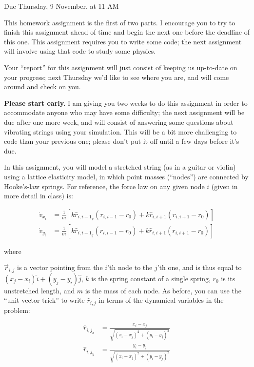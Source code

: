 \documentclass[12pt]{article}
\begin{document}
\Large
\centerline{}
\centerline{Due Thursday, 9 November, at 11 AM}
\normalsize

This homework assignment is the first of two parts. I encourage you to try to finish this assignment ahead of time
and begin the next one before the deadline of this one. This assignment requires you to write some code; the next assignment will involve using that code to study
some physics.

Your ``report'' for this assignment will just consist of keeping us up-to-date on your progress; next Thursday we'd like to see where you are, and will come around
and check on you.

{\bf Please start early.} 
I am giving you two weeks to do this assignment in order to accommodate anyone who may have some difficulty; the next assignment will be due after one more week, and will consist of answering some questions 
about vibrating strings using your simulation. This will be a bit more challenging to code than your previous one; please don't put it off until a few days before it's due.

In this assignment, you will model a stretched string (as in a guitar or violin) using a lattice elasticity model, in which point masses (``nodes'') are connected by Hooke's-law springs.
For reference, the force law on any given node $i$ (given in more detail in class) is:

\begin{align}
  \dot v_{x_i} &= \frac{1}{m} \left[ k \hat r_{{i,i-1}_x} (r_{i,i-1} - r_0) + k \hat r_{i,i+1} (r_{i,i+1} - r_0) \right] \\
  \dot v_{y_i} &= \frac{1}{m} \left[ k \hat r_{{i,i-1}_y} (r_{i,i-1} - r_0) + k \hat r_{i,i+1} (r_{i,i+1} - r_0) \right]
\end{align}

where

$\vec r_{i,j}$ is a vector pointing from the $i$'th node to the $j$'th one, and is thus equal to $(x_j-x_i)\hat i + (y_j-y_i)\hat j$, $k$ is the spring constant of a single spring, $r_0$ is its unstretched length, and $m$ is the mass of each node.
As before, you can use the ``unit vector trick'' to write $\hat r_{i,j}$ in terms of the dynamical variables in the problem:

\begin{align}
  \hat r_{{i,j}_x} &= \frac{x_i - x_j}{\sqrt{(x_i-x_j)^2 + (y_i-y_j)^2}}\\
  \hat r_{{i,j}_y} &= \frac{y_i - y_j}{\sqrt{(x_i-x_j)^2 + (y_i-y_j)^2}}
\end{align}
\end{document}
